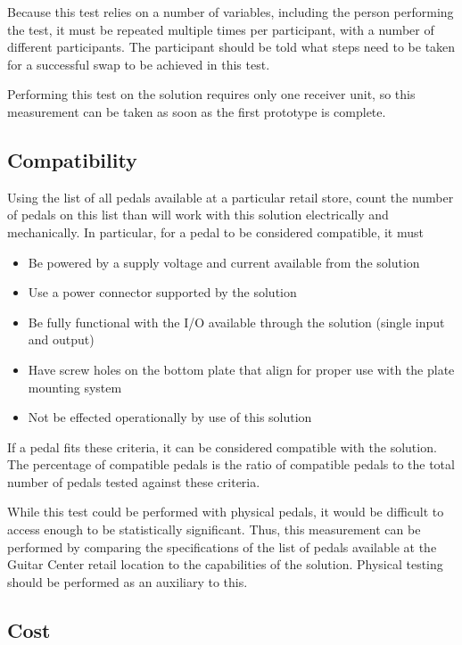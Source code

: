\documentclass{article}
\begin{document}
	Because this test relies on a number of variables, including the person performing the test, it must be repeated multiple times per participant, with a number of different participants.  The participant should be told what steps need to be taken for a successful swap to be achieved in this test.

	Performing this test on the solution requires only one receiver unit, so this measurement can be taken as soon as the first prototype is complete.

	\subsection{Compatibility}

	Using the list of all pedals available at a particular retail store, count the number of pedals on this list than will work with this solution electrically and mechanically.  In particular, for a pedal to be considered compatible, it must

	\begin{itemize}
		\item Be powered by a supply voltage and current available from the solution
		\item Use a power connector supported by the solution
		\item Be fully functional with the I/O available through the solution (single input and output)
		\item Have screw holes on the bottom plate that align for proper use with the plate mounting system
		\item Not be effected operationally by use of this solution
	\end{itemize} 

	If a pedal fits these criteria, it can be considered compatible with the solution.  The percentage of compatible pedals is the ratio of compatible pedals to the total number of pedals tested against these criteria.

	While this test could be performed with physical pedals, it would be difficult to access enough to be statistically significant.  Thus, this measurement can be performed by comparing the specifications of the list of pedals available at the Guitar Center retail location to the capabilities of the solution.  Physical testing should be performed as an auxiliary to this.

	\subsection{Cost}
\end{document}
